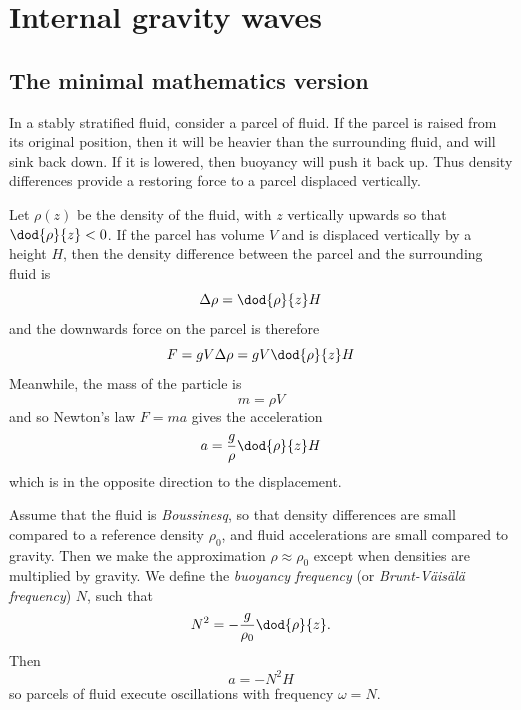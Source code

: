 \newpage
\section{Internal gravity waves} \label{section1}
\subsection{The minimal mathematics version}

In a stably stratified fluid, consider a parcel of fluid. If the parcel is raised from its original position, then it will be heavier than the surrounding fluid, and will sink back down. If it is lowered, then buoyancy will push it back up. Thus density differences provide a restoring force to a parcel displaced vertically. 

Let $\rho(z)$ be the density of the fluid, with $z$ vertically upwards so that $\dod{\rho}{z} < 0$. If the parcel has volume $V$ and is displaced vertically by a height $H$, then the density difference between the parcel and the surrounding fluid is 
\begin{equation}
	\Delta\rho = \dod{\rho}{z} H
\end{equation}
and the downwards force on the parcel is therefore
\begin{equation}
	F = gV\Delta\rho = gV\dod{\rho}{z}H
\end{equation}
Meanwhile, the mass of the particle is 
\begin{equation}
	m = \rho V
\end{equation}
and so Newton's law $F = ma$ gives the acceleration
\begin{equation}
	a = \frac{g}{\rho}\dod{\rho}{z} H
\end{equation}
which is in the opposite direction to the displacement.

Assume that the fluid is \textit{Boussinesq}, so that density differences are small compared to a reference density $\rho_0$, and fluid accelerations are small compared to gravity. Then we make the approximation $\rho\approx\rho_0$ except when densities are multiplied by gravity. We define the \textit{buoyancy frequency} (or \textit{Brunt-V\"ais\"al\"a frequency}) $N$, such that
\begin{equation}
	N^2 = -\frac{g}{\rho_0}\dod{\rho}{z}.
\end{equation}
Then 
\begin{equation}
	a = -N^2 H
\end{equation}
so parcels of fluid execute oscillations with frequency $\omega = N$.

